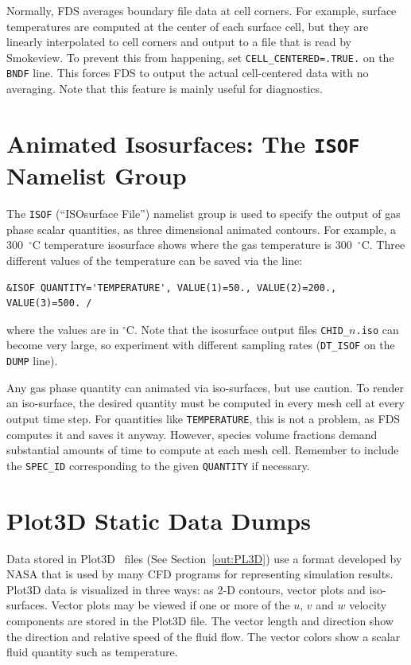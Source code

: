 \documentclass[11pt]{book}
\newcommand{\ct}{\tt\small}
\begin{document}
Normally, FDS averages boundary file data at cell corners. For example, surface temperatures are computed at the center of each surface cell, but they
are linearly interpolated to cell corners and output to a file that is read by Smokeview. To prevent this from happening,
set {\ct CELL\_CENTERED=.TRUE.} on the {\ct BNDF} line. This forces FDS to output the actual cell-centered data with no averaging. Note that this
feature is mainly useful for diagnostics.



\section{Animated Isosurfaces: The \texorpdfstring{{\tt ISOF}}{ISOF} Namelist Group}
\label{info:ISOF}

The {\ct ISOF} (``ISOsurface File'') namelist group is used to specify the output of
gas phase scalar quantities, as three dimensional animated contours.
For example, a 300~$^\circ$C temperature isosurface shows where the gas temperature is
300~$^\circ$C.
Three different values of the temperature can be saved via the line:

\footnotesize
\begin{verbatim}
&ISOF QUANTITY='TEMPERATURE', VALUE(1)=50., VALUE(2)=200., VALUE(3)=500. /
\end{verbatim}
\normalsize

\noindent
where the values are in $^\circ$C. Note that the isosurface output
files {\ct CHID\_$n$.iso} can become very large, so experiment with different sampling rates ({\ct DT\_ISOF} on the {\ct DUMP} line).


Any gas phase quantity can animated via iso-surfaces, but use caution. To render an iso-surface, the desired quantity must be
computed in every mesh cell at every output time step. For quantities like {\ct TEMPERATURE}, this is not a problem, as FDS computes it and saves it
anyway. However, species volume fractions demand substantial amounts of time to compute at each mesh cell.
Remember to include the {\ct SPEC\_ID} corresponding to the given {\ct QUANTITY} if necessary.




\section{Plot3D Static Data Dumps}
\label{info:PL3D}

Data stored in Plot3D~\cite{PLOT3D} files (See Section~\ref{out:PL3D}) use a format developed by
NASA that is used by many CFD programs for representing simulation results.
Plot3D data is visualized in three ways: as 2-D contours, vector plots and iso-surfaces.
Vector plots may be viewed if one or more of the $u$, $v$ and $w$
velocity components are stored in the Plot3D file. The vector
length and direction show the direction and relative speed of the
fluid flow. The vector colors show a scalar fluid quantity such as
temperature.
\end{document}
